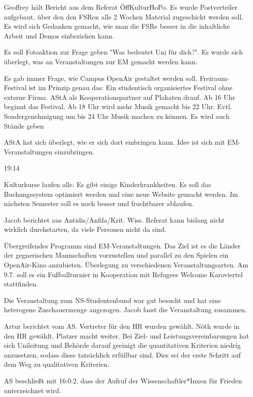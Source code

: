\documentclass[ngerman,headheight=70pt]{scrartcl}
\begin{document}
    Geoffrey hält Bericht aus dem Referat ÖffKulturHoPo. Es wurde Postverteiler
    aufgebaut, über den den FSRen alle 2 Wochen Material zugeschickt werden soll.
    Es wird sich Gedanken gemacht, wie man die FSRe besser in die inhaltliche
    Arbeit und Demos einbeziehen kann.

    Es soll Fotoaktion zur Frage geben "Was bedeutet Uni für dich?". Es wurde
    sich überlegt, was an Veranstaltungen zur EM gemacht werden kann.

    Es gab immer Frage, wie Campus OpenAir gestaltet werden soll. Freiraum-Festival
    ist im Prinzip genau das: Ein studentisch organisiertes Festival ohne externe
    Firma. AStA als Kooperationspartner auf Plakaten drauf. Ab 16 Uhr beginnt
    das Festival. Ab 18 Uhr wird mehr Musik gemacht bis 22 Uhr. Evtl. Sondergenehmigung
    um bis 24 Uhr Musik machen zu können. Es wird auch Stände geben

    AStA hat sich überlegt, wie er sich dort einbringen kann. Idee ist sich mit
    EM-Veranstaltungen einzubringen.

    19:14

    Kulturkurse laufen alle. Es gibt einige Kinderkrankheiten. Es soll das Buchungssystem
    optimiert werden und eine neue Website gemacht werden. Im nächsten Semester soll
    es noch besser und fruchtbarer ablaufen.

    Jacob berichtet aus Antidis/Anfifa/Krit. Wiss. Referat kann bislang
    nicht wirklich durchstarten, da viele Personen nicht da sind.

    Übergreifendes Programm sind EM-Veranstaltungen. Das Ziel ist es die
    Länder der gegnerischen Mannschaften vorzustellen und parallel zu
    den Spielen ein OpenAir-Kino anzubieten. Überlegung zu verschiedenen
    Veranstaltungsarten. Am 9.7. soll es ein Fußballturnier in Kooperation
    mit Refugees Welcome Karoviertel stattfinden.

    Die Veranstaltung zum NS-Studentenbund war gut besucht und hat eine
    heterogene Zuschauermenge angezogen. Jacob fasst die Veranstaltung
    zusammen.

    Artur berichtet vom AS. Vertreter für den HR wurden gewählt. Nöth
    wurde in den HR gewählt. Platzer macht weiter. Bei Ziel- und Leistungsvereinbarungen
    hat sich Unileitung und Behörde darauf geeinigt die quantitativen Kriterien
    niedrig anzusetzen, sodass diese tatsächlich erfüllbar sind. Dies sei der
    erste Schritt auf dem Weg zu qualitativen Kriterien.

    AS beschließt mit 16:0:2, dass der Aufruf der Wissenschaftler*Innen
    für Frieden unterzeichnet wird.
\end{document}
